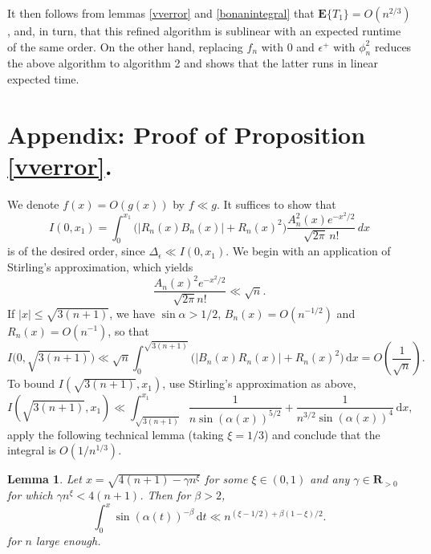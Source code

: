 \documentclass[10pt]{article}
\newtheorem{lem}[thm]{Lemma}
\theoremstyle{definition}
\theoremstyle{remark}
\newcommand{\E}{\mathbb{E}}
\newcommand{\1}{\mathbbm{1}}
\newcommand{\0}{\mathbbm{0}}
\renewcommand{\mathbb}{\mathbf}
\begin{document}
  It then follows from lemmas \ref{vverror} and \ref{bonanintegral} that $\E\{T_1\}=O(n^{2/3})$, and, in turn, that this refined algorithm is sublinear with an expected runtime of the same order.
On the other hand, replacing $f_n$ with $0$ and $\epsilon^+$ with $\phi_n^2$ reduces the above algorithm to algorithm 2 and shows that the latter runs in linear expected time.




 
\section{Appendix: Proof of Proposition \ref{vverror}.}
We denote $f(x)=O(g(x))$ by $f\ll g$. 
    It suffices to show that
  \[
        I(0,x_1)=\int_0^{x_1}\bigg( |R_n(x)B_n(x)|+R_n(x)^2\bigg)\frac{A_n^2(x)e^{-x^2/2}}{\sqrt{2\pi} \, n!}\, dx
  \]
  is of the desired order, since $\Delta_\epsilon \ll I(0,x_1)$.
We begin with an application of Stirling's approximation, which yields
\[
    \frac{A_n(x)^2e^{-x^2/2}}{\sqrt{2\pi}n!} \ll {\sqrt{n}}.
\]
If $|x|\leq \sqrt{3(n+1)}$, we have $\sin\alpha>1/2$, $B_n(x)=O(n^{-1/2})$ and $R_n(x)=O(n^{-1})$, so that
\[
    I\bigg(0,\sqrt{3(n+1)}\bigg)\ll \sqrt{n}\int_{0}^{\sqrt{3(n+1)}} \big(|B_n(x)R_n(x)|+R_n(x)^2 \big)\, \mathrm{d}x = O\left(\frac{1}{\sqrt{n}}\right).\]
To bound $I(\sqrt{3(n+1)},x_1)$, use Stirling's approximation as above,
\[
    I(\sqrt{3(n+1)}, x_1) \ll \int_{\sqrt{3(n+1)}}^{x_1} \frac{1}{n\sin(\alpha(x))^{5/2}}
    +\frac{1}{n^{3/2}\sin(\alpha(x))^{4}}\, \mathrm{d}x, 
\]
apply the following technical lemma (taking $\xi=1/3$) and conclude that the integral is $O(1/n^{1/3})$.

\begin{lem} \label{sinlemma}
   Let $x=\sqrt{4(n+1)-\gamma n^\xi}$ for some $\xi \in (0,1)$ and any $\gamma\in\mathbb{R}_{>0}$ for which $\gamma n^\xi <4(n+1)$. Then for $\beta>2$,
    \[
        \int_{0}^x \sin(\alpha(t))^{-\beta}\,\mathrm{d}t \ll n^{(\xi-1/2)+\beta(1-\xi)/2}.
    \]
   for $n$ large enough. 
\end{lem}
\end{document}
